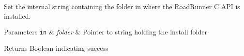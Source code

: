 Set the internal string containing the folder in where the Road\+Runner C A\+P\+I is installed. 


\begin{DoxyParams}[1]{Parameters}
\mbox{\tt in}  & {\em folder} & Pointer to string holding the install folder \\
\hline
\end{DoxyParams}
\begin{DoxyReturn}{Returns}
Boolean indicating success 
\end{DoxyReturn}
